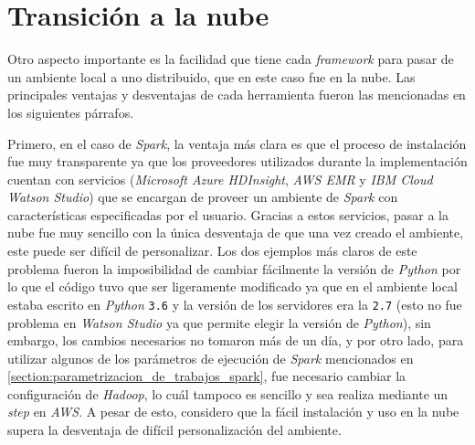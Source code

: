 \section{Transición a la nube}

Otro aspecto importante es la facilidad que tiene cada \textit{framework} para pasar de un ambiente local a uno distribuido, que en este caso fue en la nube. Las principales ventajas y desventajas de cada herramienta fueron las mencionadas en los siguientes párrafos.

Primero, en el caso de \textit{Spark}, la ventaja más clara es que el proceso de instalación fue muy transparente ya que los proveedores utilizados durante la implementación cuentan con servicios (\textit{Microsoft Azure HDInsight}, \textit{AWS EMR} y \textit{IBM Cloud Watson Studio}) que se encargan de proveer un ambiente de \textit{Spark} con características especificadas por el usuario. Gracias a estos servicios, pasar a la nube fue muy sencillo con la única desventaja de que una vez creado el ambiente, este puede ser difícil de personalizar. Los dos ejemplos más claros de este problema fueron la imposibilidad de cambiar fácilmente la versión de \textit{Python} por lo que el código tuvo que ser ligeramente modificado ya que en el ambiente local estaba escrito en \textit{Python} \texttt{3.6} y la versión de los servidores era la \texttt{2.7} (esto no fue problema en \textit{Watson Studio} ya que permite elegir la versión de \textit{Python}), sin embargo, los cambios necesarios no tomaron más de un día, y por otro lado, para utilizar algunos de los parámetros de ejecución de \textit{Spark} mencionados en \ref{section:parametrizacion_de_trabajos_spark}, fue necesario cambiar la configuración de \textit{Hadoop}, lo cuál tampoco es sencillo y sea realiza mediante un \textit{step} en \textit{AWS}. A pesar de esto, considero que la fácil instalación y uso en la nube supera la desventaja de difícil personalización del ambiente.

